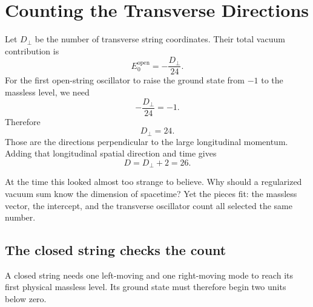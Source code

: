 \section{Counting the Transverse Directions}

Let \(D_\perp\) be the number of transverse string coordinates. Their total
vacuum contribution is
\begin{equation}
  E_0^{\mathrm{open}}
  =-\frac{D_\perp}{24}.
  \label{eq:l05-open-vacuum}
\end{equation}
For the first open-string oscillator to raise the ground state from
\(-1\) to the massless level, we need
\begin{equation}
  -\frac{D_\perp}{24}=-1.
\end{equation}
Therefore
\begin{equation}
  D_\perp=24.
\end{equation}
Those are the directions perpendicular to the large longitudinal momentum.
Adding that longitudinal spatial direction and time gives
\begin{equation}
  D=D_\perp+2=26.
  \label{eq:l05-critical-dimension}
\end{equation}

\begin{classroomqa}
\end{classroomqa}

At the time this looked almost too strange to believe. Why should a
regularized vacuum sum know the dimension of spacetime? Yet the pieces fit:
the massless vector, the intercept, and the transverse oscillator count all
selected the same number.

\subsection{The closed string checks the count}

A closed string needs one left-moving and one right-moving mode to reach its
first physical massless level. Its ground state must therefore begin two
units below zero.

